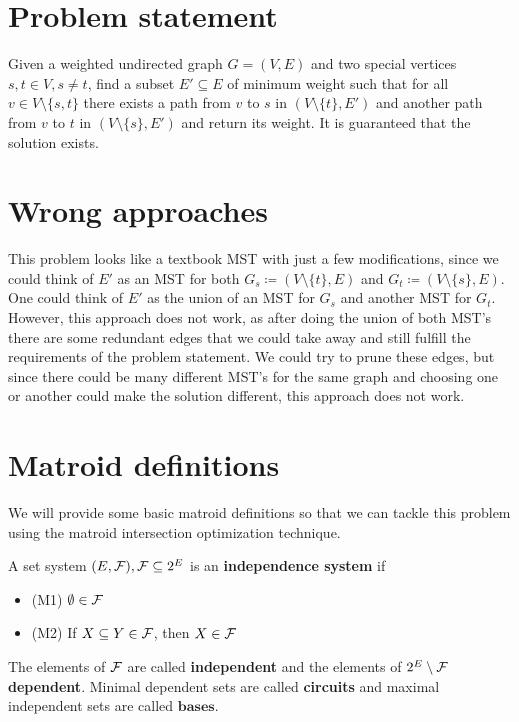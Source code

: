 \documentclass[english,12pt]{article}
\begin{document}
    \section{Problem statement}
        Given a weighted undirected graph $G = (V, E)$ and two special vertices $s, t \in V, s \neq t$, find a subset $E' \subseteq E$ of minimum weight such that for all $v \in V \setminus \{s, t\}$ there exists a path from $v$ to $s$ in $(V \setminus \{t\}, E')$ and another path from $v$ to $t$ in $(V \setminus \{s\}, E')$ and return its weight.
        It is guaranteed that the solution exists.

    \section{Wrong approaches}
        This problem looks like a textbook MST with just a few modifications, since we could think of $E'$ as an MST for both $G_s \coloneqq (V \setminus \{t\}, E)$ and $G_t \coloneqq (V \setminus \{s\}, E)$.
        One could think of $E'$ as the union of an MST for $G_s$ and another MST for $G_t$.
        However, this approach does not work, as after doing the union of both MST's there are some redundant edges that we could take away and still fulfill the requirements of the problem statement.
        We could try to prune these edges, but since there could be many different MST's for the same graph and choosing one or another could make the solution different, this approach does not work.

    \section{Matroid definitions}
        We will provide some basic matroid definitions so that we can tackle this problem using the matroid intersection optimization technique.
        \begin{definition}
            A set system $(E, \mathcal{F}), \mathcal{F} \subseteq 2^E$ is an \textbf{independence system} if
            \begin{itemize}
                \item[] (M1) $\emptyset \in \mathcal{F}$
                \item[] (M2) If $X \subseteq Y \in \mathcal{F}$, then $X \in \mathcal{F}$
            \end{itemize}
            The elements of $\mathcal{F}$ are called \textbf{independent} and the elements of $2^E \setminus \mathcal{F}$ \textbf{dependent}.
            Minimal dependent sets are called \textbf{circuits} and maximal independent sets are called $\textbf{bases}$.
        \end{definition}
\end{document}
